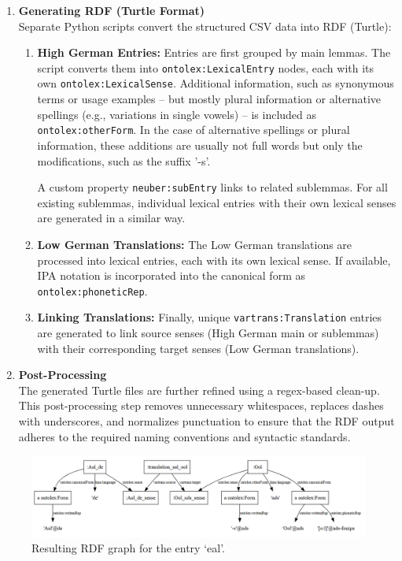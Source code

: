 \begin{enumerate}
    \item {\textbf{Generating RDF (Turtle Format)}}\\ 
    Separate Python scripts convert the structured CSV data into RDF (Turtle):
    \begin{enumerate}
        \item {\textbf{High German Entries:}} Entries are first grouped by main lemmas. The script converts them into \texttt{ontolex:LexicalEntry} nodes, each with its own \texttt{ontolex:LexicalSense}. Additional information, such as synonymous terms or usage examples -- but mostly plural information or alternative spellings (e.g., variations in single vowels) -- is included as \texttt{ontolex:otherForm}. In the case of alternative spellings or plural information, these additions are usually not full words but only the modifications, such as the suffix '-s'. 
        
        A custom property \texttt{neuber:subEntry} links to related sublemmas. For all existing sublemmas, individual lexical entries with their own lexical senses are generated in a similar way.
        \item {\textbf{Low German Translations:}} The Low German translations are processed into lexical entries, each with its own lexical sense. If available, IPA notation is incorporated into the canonical form as \texttt{ontolex:phoneticRep}.
        \item {\textbf{Linking Translations:}} Finally, unique \texttt{vartrans:Translation} entries are generated to link source senses (High German main or sublemmas) with their corresponding target senses (Low German translations).
    \end{enumerate}

    \item {\textbf{Post-Processing}}\\  
    The generated Turtle files are further refined using a regex-based clean-up. This post-processing step removes unnecessary whitespaces, replaces dashes with underscores, and normalizes punctuation to ensure that the RDF output adheres to the required naming conventions and syntactic standards.
\end{enumerate}

\begin{figure}
    \centering
    \includegraphics[width=1.0\linewidth]{aal-rdf-graph.png}
    \caption{Resulting RDF graph for the entry  `eal'.}
    \label{fig:aal-graph}
\end{figure}

